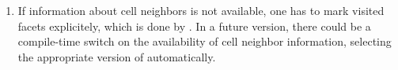 \begin{enumerate}
\item {}
If information about cell neighbors is not available, 
one has to mark visited facets explicitely,
which is done by .
In a future version, there could be a compile-time switch on the
availability of cell neighbor information, 
selecting the appropriate version of 
automatically.
\end{enumerate}
~
